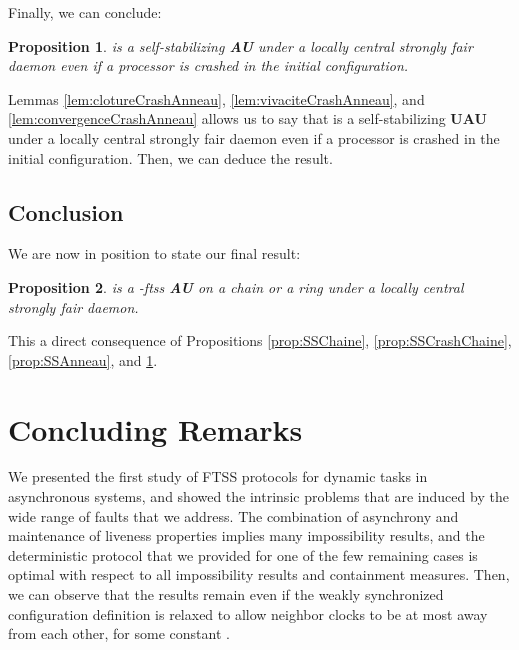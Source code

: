 \documentclass[11pt,english,letterpaper]{article}
\newtheorem{proposition}{Proposition}
\newenvironment{proof}{{\noindent\bf Proof. } }{{\hfill }}
\begin{document}
Finally, we can conclude:

\begin{proposition}\label{prop:SSCrashAnneau}
 is a self-stabilizing \textbf{AU} under a locally central strongly fair daemon even if a processor is crashed in the initial configuration.
\end{proposition}

\begin{proof}
Lemmas \ref{lem:clotureCrashAnneau}, \ref{lem:vivaciteCrashAnneau}, and \ref{lem:convergenceCrashAnneau} allows us to say that  is a self-stabilizing \textbf{UAU} under a locally central strongly fair daemon even if a processor is crashed in the initial configuration. Then, we can deduce the result.
\end{proof}
		
\subsection{Conclusion}

We are now in position to state our final result:

\begin{proposition}\label{prop:ftss}
 is a -ftss \textbf{AU} on a chain or a ring under a locally central strongly fair daemon.
\end{proposition}

\begin{proof}
This a direct consequence of Propositions \ref{prop:SSChaine}, \ref{prop:SSCrashChaine}, \ref{prop:SSAnneau}, and \ref{prop:SSCrashAnneau}.
\end{proof}

\section{Concluding Remarks}\label{sec:conclusion}

We presented the first study of FTSS protocols for dynamic tasks in asynchronous systems, and showed the intrinsic problems that are induced by the wide range of faults that we address. The combination of asynchrony and maintenance of liveness properties implies many impossibility results, and the deterministic protocol that we provided for one of the few remaining cases is optimal with respect to all impossibility results and containment measures. Then, we can observe that the results remain even if the weakly synchronized configuration definition is relaxed to allow neighbor clocks to be at most  away from each other, for some constant .
\end{document}
